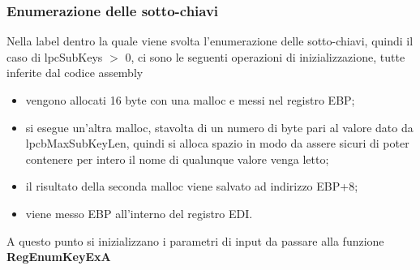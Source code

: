 \documentclass[12pt]{extarticle}
\begin{document}
\subsubsection{Enumerazione delle sotto-chiavi}
Nella label dentro la quale viene svolta l'enumerazione delle sotto-chiavi, quindi il caso di \textsf{lpcSubKeys} $>$ 0, ci sono le seguenti operazioni di inizializzazione, tutte inferite dal codice assembly
\begin{itemize}
\item vengono allocati 16 byte con una malloc e messi nel registro EBP;
\item si esegue un'altra malloc, stavolta di un numero di byte pari al valore dato da \textsf{lpcbMaxSubKeyLen}, quindi si alloca spazio in modo da assere sicuri di poter contenere per intero il nome di qualunque valore venga letto;
\item il risultato della seconda malloc viene salvato ad indirizzo EBP+8;
\item viene messo EBP all'interno del registro EDI.
\end{itemize}
A questo punto si inizializzano i parametri di input da passare alla funzione \textbf{RegEnumKeyExA}
\end{document}

